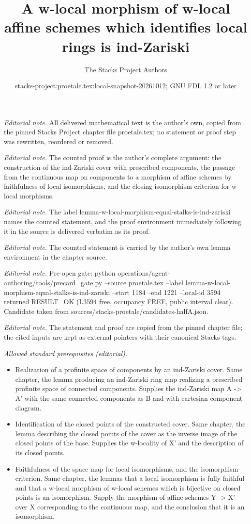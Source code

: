 \documentclass[10pt,a4paper]{amsart}
\title{A w-local morphism of w-local affine schemes which identifies local rings is ind-Zariski}
\author{The Stacks Project Authors}
\date{stacks-project:proetale.tex:local-snapshot-20261012; GNU FDL 1.2 or later}
\theoremstyle{plain}
\theoremstyle{definition}
\theoremstyle{remark}
\numberwithin{equation}{subsection}
\begin{document}
\maketitle
\noindent\textit{Editorial note.} All delivered mathematical text is the author's own, copied from the pinned Stacks Project chapter file proetale.tex; no statement or proof step was rewritten, reordered or removed.\par\medskip
\noindent\textit{Editorial note.} The counted proof is the author's complete argument: the construction of the ind-Zariski cover with prescribed components, the passage from the continuous map on components to a morphism of affine schemes by faithfulness of local isomorphisms, and the closing isomorphism criterion for w-local morphisms.\par\medskip
\noindent\textit{Editorial note.} The label lemma-w-local-morphism-equal-stalks-is-ind-zariski names the counted statement, and the proof environment immediately following it in the source is delivered verbatim as its proof.\par\medskip
\noindent\textit{Editorial note.} The counted statement is carried by the author's own lemma environment in the chapter source.\par\medskip
\noindent\textit{Editorial note.} Pre-open gate: python operations/agent-authoring/tools/precard\_gate.py --source proetale.tex --label lemma-w-local-morphism-equal-stalks-is-ind-zariski --start 1184 --end 1221 --local-id 3594 returned RESULT=OK (L3594 free, occupancy FREE, public interval clear). Candidate taken from sources/stacks-proetale/candidates-halfA.json.\par\medskip
\noindent\textit{Editorial note.} The statement and proof are copied from the pinned chapter file; the cited inputs are kept as external pointers with their canonical Stacks tags.\par\medskip
\noindent\textit{Allowed standard prerequisites (editorial).}\begin{itemize}
\item Realization of a profinite space of components by an ind-Zariski cover. Same chapter, the lemma producing an ind-Zariski ring map realizing a prescribed profinite space of connected components. Supplies the ind-Zariski map A -> A' with the same connected components as B and with cartesian component diagram.
\item Identification of the closed points of the constructed cover. Same chapter, the lemma describing the closed points of the cover as the inverse image of the closed points of the base. Supplies the w-locality of X' and the description of its closed points.
\item Faithfulness of the space map for local isomorphisms, and the isomorphism criterion. Same chapter, the lemmas that a local isomorphism is fully faithful and that a w-local morphism of w-local schemes which is bijective on closed points is an isomorphism. Supply the morphism of affine schemes Y -> X' over X corresponding to the continuous map, and the conclusion that it is an isomorphism.
\end{itemize}\medskip
\end{document}
